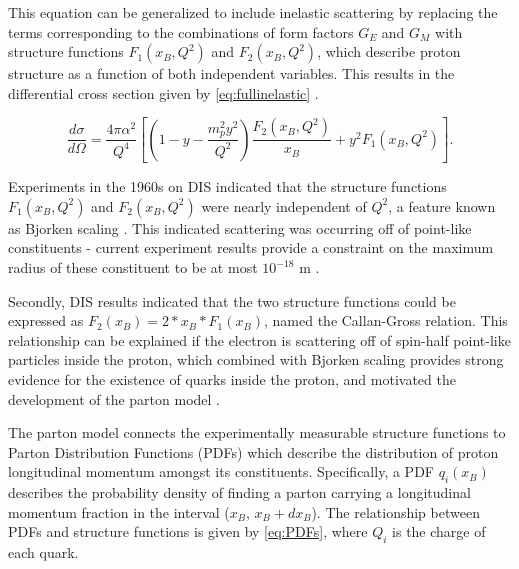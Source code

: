         This equation can be generalized to include inelastic scattering by replacing the terms corresponding to the combinations of form factors $G_E$ and $G_M$ with structure functions $F_1(x_B,Q^2)$ and $F_2(x_B,Q^2)$, which describe proton structure as a function of both independent variables. This results in the differential cross section given by \eqref{eq:fullinelastic} .

        \begin{equation}\label{eq:fullinelastic}
            \frac{d\sigma}{d\Omega} = \frac{4\pi\alpha^2}{Q^4} \left[ \left( 1 -y -\frac{m_p^2 y^2}{Q^2}       \right) \frac{F_2(x_B,Q^2)}{x_B} +y^2 F_1(x_B,Q^2) \right].
        \end{equation}


        
        Experiments in the 1960s on DIS indicated that the structure functions $F_1(x_B,Q^2)$ and $F_2(x_B,Q^2)$ were nearly independent of $Q^2$, a feature known as Bjorken scaling \parencite{Bjorken1969InelasticNucleon}. This indicated scattering was occurring off of point-like constituents - current experiment results provide a constraint on the maximum radius of these constituent to be at most $10^{-18}$ m \parencite{Thomson2013ModernPhysics}. 


        Secondly, DIS results indicated that the two structure functions could be expressed as $F_2(x_B) = 2*x_B*F_1(x_B)$, named the Callan-Gross relation. This relationship can be explained if the electron is scattering off of spin-half point-like particles inside the proton, which combined with Bjorken scaling provides strong evidence for the existence of quarks inside the proton, and motivated the development of the parton model \parencite{Feynman1969VeryHadrons}.

        
        
        The parton model connects the experimentally measurable structure functions to Parton Distribution Functions (PDFs) which describe the distribution of proton longitudinal momentum amongst its constituents. Specifically, a PDF $q_i(x_B)$ describes the probability density of finding a parton carrying a longitudinal momentum fraction in the interval ($x_B$, $x_B + dx_B$). The relationship between PDFs and structure functions is given by \eqref{eq:PDFs}, where $Q_i$ is the charge of each quark.

